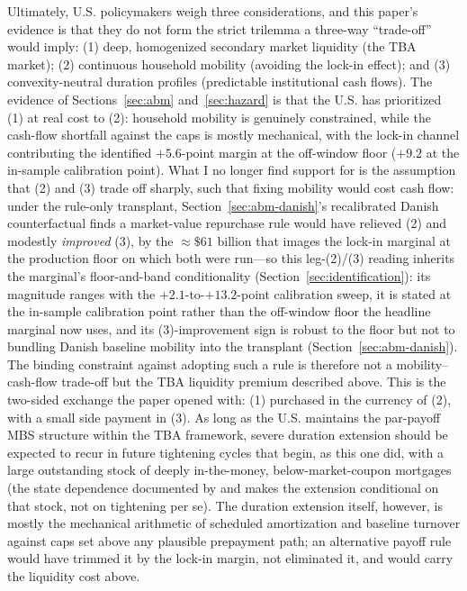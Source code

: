\documentclass[12pt]{article}
\begin{document}
Ultimately, U.S. policymakers weigh three considerations, and this paper's evidence is that they do not form the strict trilemma a three-way ``trade-off'' would imply: (1) deep, homogenized secondary market liquidity (the TBA market); (2) continuous household mobility (avoiding the lock-in effect); and (3) convexity-neutral duration profiles (predictable institutional cash flows). The evidence of Sections~\ref{sec:abm} and~\ref{sec:hazard} is that the U.S. has prioritized (1) at real cost to (2): household mobility is genuinely constrained, while the cash-flow shortfall against the caps is mostly mechanical, with the lock-in channel contributing the identified $+5.6$-point margin at the off-window floor ($+9.2$ at the in-sample calibration point). What I no longer find support for is the assumption that (2) and (3) trade off sharply, such that fixing mobility would cost cash flow: under the rule-only transplant, Section~\ref{sec:abm-danish}'s recalibrated Danish counterfactual finds a market-value repurchase rule would have relieved (2) and modestly \emph{improved} (3), by the $\approx\$61$ billion that images the lock-in marginal at the production floor on which both were run---so this leg-(2)/(3) reading inherits the marginal's floor-and-band conditionality (Section~\ref{sec:identification}): its magnitude ranges with the $+2.1$-to-$+13.2$-point calibration sweep, it is stated at the in-sample calibration point rather than the off-window floor the headline marginal now uses, and its (3)-improvement sign is robust to the floor but not to bundling Danish baseline mobility into the transplant (Section~\ref{sec:abm-danish}). The binding constraint against adopting such a rule is therefore not a mobility--cash-flow trade-off but the TBA liquidity premium described above. This is the two-sided exchange the paper opened with: (1) purchased in the currency of (2), with a small side payment in (3). As long as the U.S. maintains the par-payoff MBS structure within the TBA framework, severe duration extension should be expected to recur in future tightening cycles that begin, as this one did, with a large outstanding stock of deeply in-the-money, below-market-coupon mortgages (the state dependence documented by \citet{berger2021} and \citet{eichenbaum2022} makes the extension conditional on that stock, not on tightening per se). The duration extension itself, however, is mostly the mechanical arithmetic of scheduled amortization and baseline turnover against caps set above any plausible prepayment path; an alternative payoff rule would have trimmed it by the lock-in margin, not eliminated it, and would carry the liquidity cost above.
\end{document}
